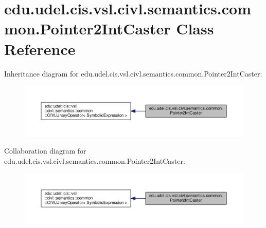 \hypertarget{classedu_1_1udel_1_1cis_1_1vsl_1_1civl_1_1semantics_1_1common_1_1Pointer2IntCaster}{}\section{edu.\+udel.\+cis.\+vsl.\+civl.\+semantics.\+common.\+Pointer2\+Int\+Caster Class Reference}
\label{classedu_1_1udel_1_1cis_1_1vsl_1_1civl_1_1semantics_1_1common_1_1Pointer2IntCaster}


Inheritance diagram for edu.\+udel.\+cis.\+vsl.\+civl.\+semantics.\+common.\+Pointer2\+Int\+Caster\+:
\nopagebreak
\begin{figure}[H]
\begin{center}
\leavevmode
\includegraphics[width=350pt]{classedu_1_1udel_1_1cis_1_1vsl_1_1civl_1_1semantics_1_1common_1_1Pointer2IntCaster__inherit__graph}
\end{center}
\end{figure}


Collaboration diagram for edu.\+udel.\+cis.\+vsl.\+civl.\+semantics.\+common.\+Pointer2\+Int\+Caster\+:
\nopagebreak
\begin{figure}[H]
\begin{center}
\leavevmode
\includegraphics[width=350pt]{classedu_1_1udel_1_1cis_1_1vsl_1_1civl_1_1semantics_1_1common_1_1Pointer2IntCaster__coll__graph}
\end{center}
\end{figure}
